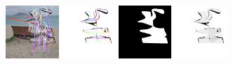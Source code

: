      \includegraphics[width=0.15\textwidth]{ch-tomnet/images/Dataset/render_gt_shape0040_COCO_val2014_000000028826_cores}
     \includegraphics[width=0.15\textwidth]{ch-tomnet/images/Dataset/render_gt_shape0040_COCO_val2014_000000028826_flow}
     \includegraphics[width=0.15\textwidth]{ch-tomnet/images/Dataset/render_gt_shape0040_COCO_val2014_000000028826_mask}
     \includegraphics[width=0.15\textwidth]{ch-tomnet/images/Dataset/render_gt_shape0040_COCO_val2014_000000028826_rho}
     \\
